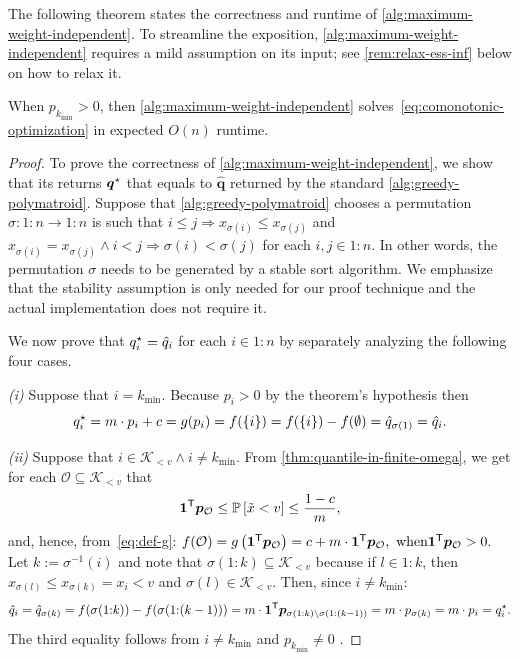 \documentclass[10pt]{article} %
\begin{document}
The following theorem states the correctness and runtime of \cref{alg:maximum-weight-independent}. To streamline the exposition, \cref{alg:maximum-weight-independent} requires a mild assumption on its input; see \cref{rem:relax-ess-inf} below on how to relax it. 
\begin{theorem}
When $p_{k_{\min}} >0$, then \cref{alg:maximum-weight-independent} solves~\eqref{eq:comonotonic-optimization} in expected $O(n)$ runtime. 
\end{theorem}
\begin{proof}
To prove the correctness of \cref{alg:maximum-weight-independent}, we show that its returns $\bm{q}^{\mathnormal{\star}}$ that equals to $\hat{\bm{q}}$ returned by the standard \cref{alg:greedy-polymatroid}. Suppose that \cref{alg:greedy-polymatroid} chooses a permutation $\sigma\colon  1{:}n \to 1{:}n$ is such that $i \le j \Rightarrow x_{\sigma(i)} \le x_{\sigma(j)}$ and $x_{\sigma(i)} = x_{\sigma(j)} \wedge i < j \Rightarrow \sigma(i) < \sigma(j)$ for each $i,j\in 1{:}n$. In other words, the permutation $\sigma$ needs to be generated by a stable sort algorithm. We emphasize that the stability assumption is only needed for our proof technique and the actual implementation does not require it.

We now prove that $q^{\mathnormal{\star}}_i = \hat{q}_i$ for each $i\in 1{:}n$ by separately analyzing the following four cases.

\emph{(i)} Suppose that $i = k_{\min}$. Because $p_i > 0$ by the theorem's hypothesis then 
\[
  q^{\mathnormal{\star}}_i = m\cdot p_i + c = g(p_i) = f(\{i\}) = f(\{i\}) - f(\emptyset) = \hat{q}_{\sigma(1)} = \hat{q}_i.
\]

\emph{(ii)} Suppose that $i \in \mathcal{K}_{<v} \wedge i \neq k_{\min}$. From \cref{thm:quantile-in-finite-omega}, we get for each $\mathcal{O} \subseteq \mathcal{K}_{<v}$ that
\begin{equation} \label{eq:lt-v-prob}
 \bm{1}^{\mathsf{T}} \bm{p}_{\mathcal{O}} \le \mathbb{P}\left[ \tilde{x} < v \right] \le \frac{1-c}{m} ,
\end{equation}
and, hence, from~\eqref{eq:def-g}:
\(  f(\mathcal{O}) = g\left(\bm{1}^{\mathsf{T}} \bm{p}_{\mathcal{O}}\right) = c + m \cdot \bm{1}^{\mathsf{T}} \bm{p}_{\mathcal{O}},
  \text{ when}
  \bm{1}^{\mathsf{T}} \bm{p}_{\mathcal{O}} > 0.
\) 
Let $k := \sigma^{-1}(i)$ and note that $ \sigma(1{:}k) \subseteq \mathcal{K}_{< v} $ because if $l \in 1{:}k$, then $x_{\sigma(l)} \le x_{\sigma(k)} = x_i < v$ and $\sigma(l) \in \mathcal{K}_{< v}$. Then, since $i \neq k_{\min}$:
\[
 \hat{q}_i = \hat{q}_{\sigma(k)} = f(\sigma(1{:}k)) - f(\sigma(1{:}(k-1)))
= m \cdot \bm{1}^{\mathsf{T}} \bm{p}_{\sigma(1{:}k) \setminus \sigma(1{:}(k-1)) } = m\cdot p_{\sigma(k)} = m\cdot p_i = q^{\mathnormal{\star}}_i. 
\]
The third equality follows from $i \neq k_{\min}$ and $p_{k_{\min}} \neq  0$ .


\end{proof}
\end{document}

